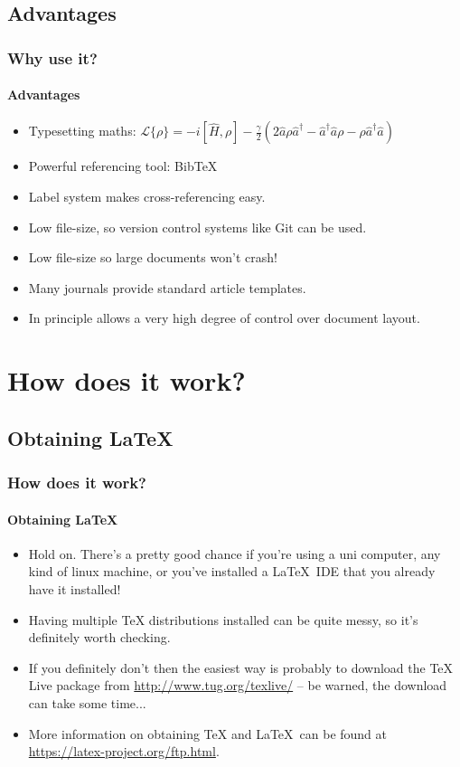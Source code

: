\documentclass{beamer}
\begin{document}
\subsection[Pros]{Advantages}
\begin{frame}
\frametitle{Why use it?}
\framesubtitle{Advantages}

\begin{itemize}
\item Typesetting maths: \(\mathcal{L}\{\rho\} = -i[\hat{H}, \rho] - \frac{\gamma}{2}\left(2 \hat{a}\rho\hat{a}^{\dagger} - \hat{a}^{\dagger}\hat{a}\rho - \rho\hat{a}^{\dagger}\hat{a}\right)\)
\item Powerful referencing tool: BibTeX
\item Label system makes cross-referencing easy.
\item Low file-size, so version control systems like Git can be used.
\item Low file-size so large documents won't crash!
\item Many journals provide standard article templates.
\item In principle allows a very high degree of control over document layout.
\end{itemize}
\end{frame}

\section{How does it work?}

\subsection{Obtaining \LaTeX}
\begin{frame}
\frametitle{How does it work?}
\framesubtitle{Obtaining \LaTeX}
\begin{itemize}
\item \alert{Hold on.} There's a pretty good chance if you're using a uni computer, any kind of linux machine, or you've installed a \LaTeX\ IDE that you already have it installed!
\item Having multiple TeX distributions installed can be quite messy, so it's definitely worth checking.
\item If you definitely don't then the easiest way is probably to download the TeX Live package from \url{http://www.tug.org/texlive/} -- be warned, the download can take some time...
\item More information on obtaining TeX and \LaTeX\ can be found at \url{https://latex-project.org/ftp.html}.
\end{itemize}
\end{frame}
\end{document}

